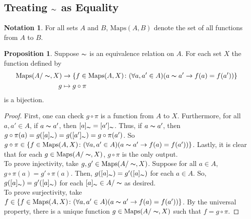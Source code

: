 \documentclass[14pt]{article}
\theoremstyle{definition}
\newtheorem{proposition}[definition]{Proposition}
\newtheorem{notation}[definition]{Notation}
\begin{document}
\vspace{5mm}

\subsection{Treating $\thicksim$ as Equality}


\begin{notation}
    For all sets $A$ and $B$,  $\mathrm{Maps}(A,B)$ denote the set of all functions from $A$ to $B$.

\end{notation}

\begin{proposition}
    Suppose $\thicksim$ is an equivalence relation on $A$. For each set $X$ the function defined by
    \begin{equation*}
        \begin{split}
            \mathrm{Maps}(A/\thicksim, X)&\rightarrow\{f\in \mathrm{Maps}(A,X)\colon (\forall a, a'\in A)(a\thicksim a' \rightarrow f(a)=f(a')) \}\\
           g&\mapsto g\circ \pi
        \end{split}
    \end{equation*}
    is a bijection.
\end{proposition}

\begin{proof}
    First, one can check $g\circ \pi$ is a function from $A$ to $X$. Furthermore, for all $a,a'
    \in A$, if $a\thicksim a'$, then $[a]_{\thicksim}=[a']_{\thicksim }$. Thus, if $a\thicksim a'$, then $g\circ\pi (a)= g([a]_{\thicksim })=g([a']_{\thicksim })=g\circ\pi(a')$.
    So $g\circ \pi\in \{f\in \mathrm{Maps}(A,X)\colon (\forall a, a'\in A)(a\thicksim a' \rightarrow f(a)=f(a')) \}$. Lastly, it is clear that for each $g\in \mathrm{Maps}(A/\thicksim, X)$, $g\circ \pi$ is the only output.\\
    To prove injectivity, take $g, g'\in \mathrm{Maps}(A/\thicksim, X)$. Suppose for all $a\in A$, $g\circ\pi(a)=g'\circ\pi(a)$. Then, $g([a]_{\thicksim })=g'([a]_{\thicksim })$ for each $a\in A$. 
    So, $g([a]_{\thicksim })=g'([a]_{\thicksim })$ for each $[a]_{\thicksim}\in A/\thicksim$ as desired.\\
    To prove surjectivity, take $f\in\{f\in \mathrm{Maps}(A,X)\colon (\forall a, a'\in A)(a\thicksim a' \rightarrow f(a)=f(a')) \}$.
    By the universal property, there is a unique function $g\in \mathrm{Maps}(A/\thicksim, X)$
    such that $f=g\circ \pi$.

\end{proof}
\end{document}
